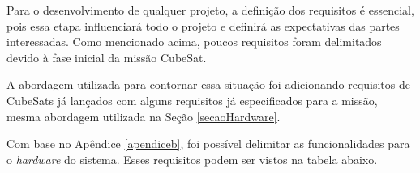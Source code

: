 Para o desenvolvimento de qualquer projeto, a definição dos requisitos é essencial, pois essa etapa influenciará todo o projeto e definirá as expectativas das partes interessadas. Como mencionado acima, poucos requisitos foram delimitados devido à fase inicial da missão CubeSat.

A abordagem utilizada para contornar essa situação foi adicionando requisitos de CubeSats já lançados com alguns requisitos já especificados para a missão, mesma abordagem utilizada na Seção \ref{secaoHardware}.

Com base no Apêndice \ref{apendiceb}, foi possível delimitar as funcionalidades para o \textit{hardware} do sistema. Esses requisitos podem ser vistos na tabela abaixo.

